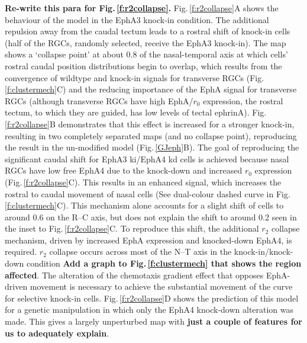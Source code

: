 \documentclass[11pt, a4paper]{article}
\begin{document}
\textbf{Re-write this para for Fig.\,\ref{f:r2collapse}.}
Fig.\,\ref{f:r2collapse}A shows the behaviour of the model in the EphA3 knock-in condition.
The additional repulsion away from the caudal tectum leads to a rostral shift of knock-in cells (half of the RGCs, randomly selected, receive the EphA3 knock-in).
The map shows a `collapse point' at about 0.8 of the nasal-temporal axis at which cells' rostral caudal position distributions begin to overlap, which results from the convergence of wildtype and knock-in signals for transverse RGCs (Fig.\,\ref{f:clustermech}C) and the reducing importance of the EphA signal for transverse RGCs (although transverse RGCs have high EphA/$r_0$ expression, the rostral tectum, to which they are guided, has low levels of tectal ephrinA).
Fig.\,\ref{f:r2collapse}B demonstrates that this effect is increased for a stronger knock-in, resulting in two completely separated maps (and no collapse point), reproducing the result in the un-modified model (Fig.\,\ref{GJeph}B).
The goal of reproducing the significant caudal shift for EphA3 ki/EphA4 kd cells is achieved because nasal RGCs have low free EphA4 due to the knock-down and increased $r_0$ expression (Fig.\,\ref{f:r2collapse}C).
This results in an enhanced signal, which increases the rostral to caudal movement of nasal cells (See dual-colour dashed curve in Fig.\,\ref{f:clustermech}C).
This mechanism alone accounts for a slight shift of cells to around 0.6 on the R--C axis, but does not explain the shift to around 0.2 seen in the inset to Fig.\,\ref{f:r2collapse}C.
To reproduce this shift, the additional $r_2$ collapse mechanism, driven by increased EphA expression and knocked-down EphA4, is required. $r_2$ collapse occurs across most of the N--T axis in the knock-in/knock-down condition \textbf{Add a graph to Fig.\,\ref{f:clustermech} that shows the region affected}.
The alteration of the chemotaxis gradient effect that opposes EphA-driven movement is necessary to achieve the substantial movement of the curve for selective knock-in cells.
Fig.\,\ref{f:r2collapse}D shows the prediction of this model for a genetic manipulation in which only the EphA4 knock-down alteration was made. This gives a largely unperturbed map with \textbf{just a couple of features for us to adequately explain}.

\end{document}
